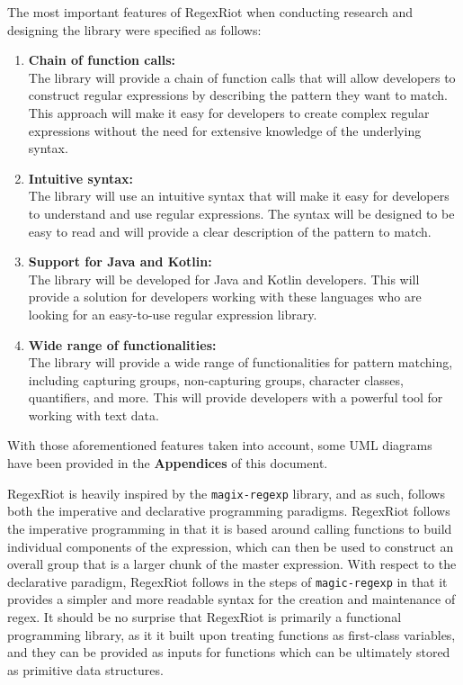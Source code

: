 \documentclass[conference]{IEEEtran}
\begin{document}
The most important features of RegexRiot when conducting research and
designing the library were specified as follows:

\begin{enumerate}
    \item \textbf{Chain of function calls:}\\
          The library will provide a chain of function calls that will allow developers
          to construct regular expressions by describing the pattern they want to match.
          This approach will make it easy for developers to create complex regular expressions
          without the need for extensive knowledge of the underlying syntax.

    \item \textbf{Intuitive syntax:}\\
          The library will use an intuitive syntax that will make it easy for developers
          to understand and use regular expressions. The syntax will be designed to be easy
          to read and will provide a clear description of the pattern to match.

    \item \textbf{Support for Java and Kotlin:}\\
          The library will be developed for Java and Kotlin developers. \cite{oracle_docs1997}
          This will provide a solution for developers working with these languages who are
          looking for an easy-to-use regular expression library.\cite{kotlin_docs2023}

          \vfill\eject

    \item \textbf{Wide range of functionalities:}\\
          The library will provide a wide range of functionalities for pattern matching,
          including capturing groups, non-capturing groups, character classes, quantifiers,
          and more. This will provide developers with a powerful tool for working with text data.
\end{enumerate}

With those aforementioned features taken into account,
some UML diagrams have been provided in the \textbf{Appendices} of this
document.

RegexRiot is heavily inspired by the \texttt{magix-regexp} library, and as such,
follows both the imperative and declarative programming paradigms. \cite{magic-regexp}
RegexRiot follows the imperative programming in that it is based around calling functions
to build individual components of the expression, which can then be used to construct an
overall group that is a larger chunk of the master expression. With respect to the
declarative paradigm, RegexRiot follows in the steps of \texttt{magic-regexp}
in that it provides a simpler and more readable syntax for the creation and
maintenance of regex. It should be no surprise that RegexRiot is primarily a functional programming
library, as it it built upon treating functions as first-class variables, and they can be provided as inputs
for functions which can be ultimately stored as primitive data structures.
\end{document}

